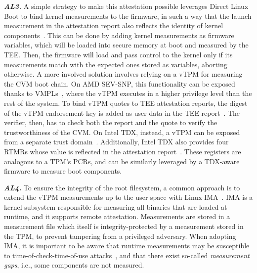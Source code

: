 \noindent\textbf{\emph{AL3.}}
%
A simple strategy to make this attestation possible leverages Direct Linux Boot
to bind kernel measurements to the firmware, in such a way that the launch
measurement in the attestation report also reflects the identity of kernel
components~\cite{kernelHashesOvmf}. This can be done by adding kernel
measurements as firmware variables, which will be loaded into secure memory at
boot and measured by the \ac{TEE}. Then, the firmware will load and pass control
to the kernel only if its measurements match with the expected ones stored as
variables, aborting otherwise. A more involved solution involves relying on a
\ac{vTPM} for measuring the \ac{CVM} boot chain. On AMD SEV-SNP, this
functionality can be exposed thanks to \acp{VMPL}~\cite{AmdSevAbi}, where the
\ac{vTPM} executes in a higher privilege level than the rest of the system. To
bind \ac{vTPM} quotes to \ac{TEE} attestation reports, the digest of the
\ac{vTPM} endorsement key is added as user data in the \ac{TEE}
report~\cite{narayanan2023svsm}. The verifier, then, has to check both the
report and the quote to verify the trustworthiness of the \ac{CVM}. On Intel
\ac{TDX}, instead, a \ac{vTPM} can be exposed from a separate trust
domain~\cite{intelTdxvTPM}. Additionally, Intel \ac{TDX} also provides four
\acp{RTMR} whose value is reflected in the attestation
report~\cite{intelTdxModule}. These registers are analogous to a \ac{TPM}'s
PCRs, and can be similarly leveraged by a TDX-aware firmware to measure boot
components.

\noindent\textbf{\emph{AL4.}}
%
To ensure the integrity of the root filesystem, a common approach is to extend
the \ac{vTPM} measurements up to the user space with Linux
\ac{IMA}~\cite{sailer2004ima}. \ac{IMA} is a kernel subsystem responsible for
measuring all binaries that are loaded at runtime, and it supports remote
attestation. Measurements are stored in a measurement file which itself is
integrity-protected by a measurement stored in the TPM, to prevent tampering
from a privileged adversary. When adopting \ac{IMA}, it is important to be aware
that runtime measurements may be susceptible to time-of-check-time-of-use
attacks~\cite{bohling2020imatoctou}, and that there exist so-called
\emph{measurement gaps}, i.e., some components are not measured.

